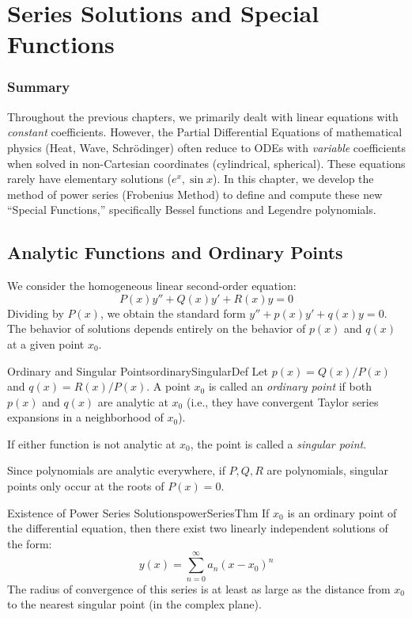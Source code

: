\documentclass{book}
\newcommand{\qn}{\quad\newline}
\begin{document}
\chapter{Series Solutions and Special Functions}\label{cha:seriesSolutions}

\subsection*{Summary}
Throughout the previous chapters, we primarily dealt with linear equations with \emph{constant} coefficients. However, the Partial Differential Equations of mathematical physics (Heat, Wave, Schrödinger) often reduce to ODEs with \emph{variable} coefficients when solved in non-Cartesian coordinates (cylindrical, spherical). These equations rarely have elementary solutions ($e^x, \sin x$). In this chapter, we develop the method of power series (Frobenius Method) to define and compute these new ``Special Functions,'' specifically Bessel functions and Legendre polynomials.

\section{Analytic Functions and Ordinary Points}

We consider the homogeneous linear second-order equation:
\begin{equation}\label{eq:varCoeff}
    P(x)y'' + Q(x)y' + R(x)y = 0
\end{equation}
Dividing by $P(x)$, we obtain the standard form $y'' + p(x)y' + q(x)y = 0$. The behavior of solutions depends entirely on the behavior of $p(x)$ and $q(x)$ at a given point $x_0$.

\begin{defn}{Ordinary and Singular Points}{ordinarySingularDef}
    Let $p(x) = Q(x)/P(x)$ and $q(x) = R(x)/P(x)$. A point $x_0$ is called an \emph{ordinary point} if both $p(x)$ and $q(x)$ are analytic at $x_0$ (i.e., they have convergent Taylor series expansions in a neighborhood of $x_0$).

	\qn
    If either function is not analytic at $x_0$, the point is called a \emph{singular point}.
\end{defn}

Since polynomials are analytic everywhere, if $P, Q, R$ are polynomials, singular points only occur at the roots of $P(x) = 0$.

\begin{thm}{Existence of Power Series Solutions}{powerSeriesThm}
    If $x_0$ is an ordinary point of the differential equation, then there exist two linearly independent solutions of the form:
    \[
        y(x) = \sum_{n=0}^\infty a_n (x - x_0)^n
    \]
    The radius of convergence of this series is at least as large as the distance from $x_0$ to the nearest singular point (in the complex plane).
\end{thm}
\end{document}
